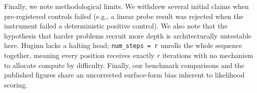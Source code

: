 \documentclass{article}
\begin{document}
Finally, we note methodological limits. We withdrew several initial claims when pre-registered controls failed (e.g., a linear probe result was rejected when the instrument failed a deterministic positive control). We also note that the hypothesis that harder problems recruit more depth is architecturally untestable here. Huginn lacks a halting head; \texttt{num\_steps = r} unrolls the whole sequence together, meaning every position receives exactly $r$ iterations with no mechanism to allocate compute by difficulty. Finally, our benchmark comparisons and the published figures share an uncorrected surface-form bias inherent to likelihood scoring.
\end{document}
